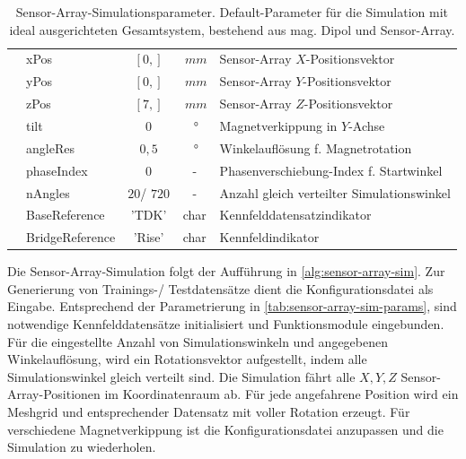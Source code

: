 \begin{table}[!htbp]
{\begin{tabular}{l l c c l}
		                                         & xPos               & $\left[0,\right]$  & $\SI{}{mm}$                     & Sensor-Array $X$-Positionsvektor                \\
		                                         & yPos               & $\left[0,\right]$  & $\SI{}{mm}$                     & Sensor-Array $Y$-Positionsvektor                \\
		                                         & zPos               & $\left[7,\right]$  & $\SI{}{mm}$                     & Sensor-Array $Z$-Positionsvektor                \\
		                                         & tilt               & $0$                & $\SI{}{\degree}$                & Magnetverkippung in $Y$-Achse                   \\
		                                         & angleRes           & $0,5$              & $\SI{}{\degree}$                & Winkelauflösung f. Magnetrotation               \\
		                                         & phaseIndex         & 0                  & -                               & Phasenverschiebung-Index f. Startwinkel         \\
		                                         & nAngles            & $20$/ $720$        & -                               & Anzahl gleich verteilter Simulationswinkel      \\
		                                         & BaseReference      & 'TDK'              & char                            & Kennfelddatensatzindikator                      \\
		                                         & BridgeReference    & 'Rise'             & char                            & Kennfeldindikator                               \\ \bottomrule
	\end{tabular}}
	\caption[Sensor-Array-Simulationsparameter]{Sensor-Array-Simulationsparameter. Default-Parameter für die Simulation mit ideal ausgerichteten Gesamtsystem, bestehend aus mag. Dipol und Sensor-Array.}
	\label{tab:sensor-array-sim-params}
\end{table}


\clearpage


Die Sensor-Array-Simulation folgt der Aufführung in \autoref{alg:sensor-array-sim}. Zur Generierung von Trainings-/ Testdatensätze dient die Konfigurationsdatei als Eingabe. Entsprechend der Parametrierung in \autoref{tab:sensor-array-sim-params}, sind notwendige Kennfelddatensätze initialisiert und Funktionsmodule eingebunden. Für die eingestellte Anzahl von Simulationswinkeln und angegebenen Winkelauflösung, wird ein Rotationsvektor aufgestellt, indem alle Simulationswinkel gleich verteilt sind. Die Simulation fährt alle $X,Y,Z$ Sensor-Array-Positionen im Koordinatenraum ab. Für jede angefahrene Position wird ein Meshgrid und entsprechender Datensatz mit voller Rotation erzeugt. Für verschiedene Magnetverkippung ist die Konfigurationsdatei anzupassen und die Simulation zu wiederholen.


